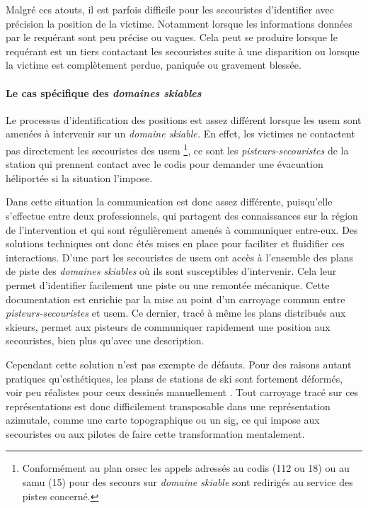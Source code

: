 Malgré ces atouts, il est parfois difficile pour les secouristes
d'identifier avec précision la position de la victime. Notamment
lorsque les informations données par le requérant sont peu précise ou
vagues. Cela peut se produire lorsque le requérant est un tiers
contactant les secouristes suite à une disparition ou lorsque la
victime est complètement perdue, paniquée ou gravement blessée.

\paragraph{Le cas spécifique des \emph{domaines skiables}}

Le processus d'identification des positions est assez différent
lorsque les \ac{usem} sont amenées à intervenir sur un \emph{domaine
  skiable.} En effet, les victimes ne contactent pas directement les
secouristes des \ac{usem} \footnote{Conformément au plan \ac{orsec}
  les appels adressés au \ac{codis} (112 ou 18) ou au \ac{samu} (15)
  pour des secours sur \emph{domaine skiable} sont redirigés au
  service des pistes concerné.}, ce sont les
\emph{pisteurs-secouristes} de la station qui prennent contact avec le
\ac{codis} pour demander une évacuation héliportée si la situation
l'impose.

Dans cette situation la communication est donc assez différente,
puisqu'elle s'effectue entre deux professionnels, qui partagent des
connaissances sur la région de l'intervention et qui sont
régulièrement amenés à communiquer entre-eux. Des solutions techniques
ont donc étés mises en place pour faciliter et fluidifier ces
interactions. D'une part les secouristes de \ac{usem} ont accès à
l'ensemble des plans de piste des \emph{domaines skiables} où ils sont
susceptibles d'intervenir. Cela leur permet d'identifier facilement
une piste ou une remontée mécanique. Cette documentation est enrichie
par la mise au point d'un carroyage commun entre
\emph{pisteurs-secouristes} et \ac{usem}. Ce dernier, tracé à même les
plans distribués aux skieurs, permet aux pisteurs de communiquer
rapidement une position aux secouristes, bien plus qu'avec une
description.

Cependant cette solution n'est pas exempte de défauts. Pour des
raisons autant pratiques qu’esthétiques, les plans de stations de ski
sont fortement déformés, voir peu réalistes pour ceux dessinés
manuellement \autocite{Gauchon2014,LaPorte2017}. Tout carroyage tracé
sur ces représentations est donc difficilement transposable dans une
représentation azimutale, comme une carte topographique ou un
\ac{sig}, ce qui impose aux secouristes ou aux pilotes de faire cette
transformation mentalement.

